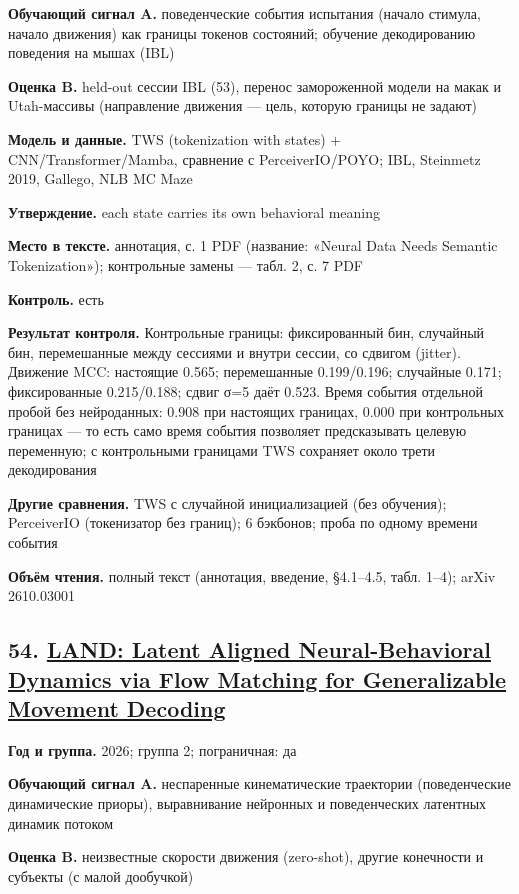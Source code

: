 \textbf{Обучающий сигнал A.} поведенческие события испытания (начало стимула, начало движения) как границы токенов состояний; обучение декодированию поведения на мышах (IBL)

\textbf{Оценка B.} held-out сессии IBL (53), перенос замороженной модели на макак и Utah-массивы (направление движения — цель, которую границы не задают)

\textbf{Модель и данные.} TWS (tokenization with states) + CNN/Transformer/Mamba, сравнение с PerceiverIO/POYO; IBL, Steinmetz 2019, Gallego, NLB MC Maze

\textbf{Утверждение.} each state carries its own behavioral meaning

\textbf{Место в тексте.} аннотация, с. 1 PDF (название: «Neural Data Needs Semantic Tokenization»); контрольные замены — табл. 2, с. 7 PDF

\textbf{Контроль.} есть

\textbf{Результат контроля.} Контрольные границы: фиксированный бин, случайный бин, перемешанные между сессиями и внутри сессии, со сдвигом (jitter). Движение MCC: настоящие 0.565; перемешанные 0.199/0.196; случайные 0.171; фиксированные 0.215/0.188; сдвиг σ=5 даёт 0.523. Время события отдельной пробой без нейроданных: 0.908 при настоящих границах, 0.000 при контрольных границах — то есть само время события позволяет предсказывать целевую переменную; с контрольными границами TWS сохраняет около трети декодирования

\textbf{Другие сравнения.} TWS с случайной инициализацией (без обучения); PerceiverIO (токенизатор без границ); 6 бэкбонов; проба по одному времени события

\textbf{Объём чтения.} полный текст (аннотация, введение, §4.1–4.5, табл. 1–4); arXiv 2610.03001


\subsection*{54. \href{https://doi.org/10.64898/2026.08.19.745390}{LAND: Latent Aligned Neural-Behavioral Dynamics via Flow Matching for Generalizable Movement Decoding}}

\textbf{Год и группа.} 2026; группа 2; пограничная: да

\textbf{Обучающий сигнал A.} неспаренные кинематические траектории (поведенческие динамические приоры), выравнивание нейронных и поведенческих латентных динамик потоком

\textbf{Оценка B.} неизвестные скорости движения (zero-shot), другие конечности и субъекты (с малой дообучкой)

